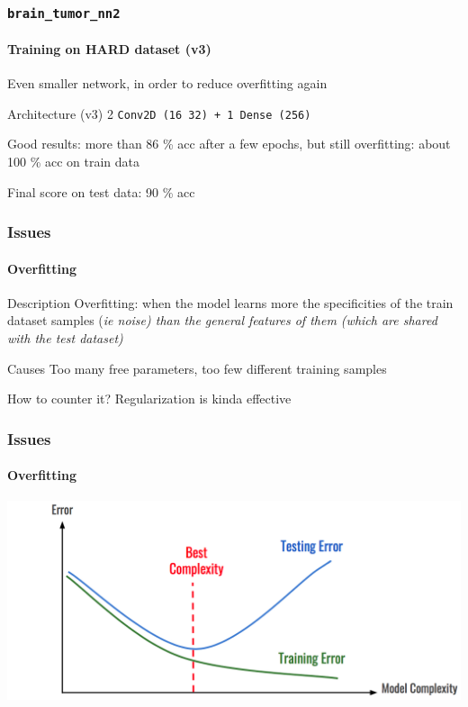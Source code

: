 \documentclass[]{beamer}
\newcommand{\btnt}{\tt{brain\_tumor\_nn2}}
\begin{document}
\begin{frame}
  \frametitle{\btnt}
  \framesubtitle{Training on HARD dataset (v3)}

  Even smaller network, in order to reduce overfitting again

  \begin{exampleblock}{Architecture (v3)}
    2 \tt{Conv2D} (16 32) + 1 \tt{Dense} (256)
  \end{exampleblock}

  Good results: more than \alert{86 \% acc} after a few epochs, but still \alert{overfitting}: about \alert{100 \% acc} on train data

  \medskip

  Final score on test data: \alert{90 \% acc}
\end{frame}

\begin{frame}
  \frametitle{Issues}
  \framesubtitle{Overfitting}

  \begin{block}{Description}
    Overfitting: when the model learns more the specificities of the train dataset samples (\it{ie} noise) than the general features of them (which are shared with the test dataset)
  \end{block}

  \begin{alertblock}{Causes}
    Too many free parameters, too few different training samples
  \end{alertblock}

  \begin{exampleblock}{How to counter it?}
    Regularization is kinda effective
  \end{exampleblock}
\end{frame}

\begin{frame}
  \frametitle{Issues}
  \framesubtitle{Overfitting}
  \begin{center}
    \includegraphics[width=\linewidth]{resources/overfitting}
  \end{center}
\end{frame}
\end{document}
